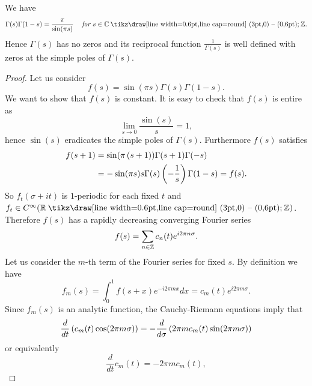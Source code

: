 \begin{theorem}
	We have
\begin{equation*}
	\Gamma(s)\Gamma(1 - s) = \frac{\pi}{\sin(\pi s)} \hsp \textit{  for } s \in \field{C} \mysetminus \field{Z}.
\end{equation*}
	Hence $\Gamma(s)$ has no zeros and its reciprocal function $\frac{1}{\Gamma(s)}$ is well defined with zeros at the simple poles of $\Gamma(s)$.
\end{theorem}
\begin{proof}
	Let us consider
\begin{equation*}
	f(s) = \sin(\pi s) \Gamma(s) \Gamma(1 - s).
\end{equation*}
	We want to show that $f(s)$ is constant. It is easy to check that $f(s)$ is entire as
\begin{equation*}
	\lim\limits_{s \to 0} \frac{\sin(s)}{s} = 1,
\end{equation*}
	hence $\sin(s)$ eradicates the simple poles of $\Gamma(s)$. Furthermore $f(s)$ satisfies
\begin{equation*}
\begin{aligned}
	f(s + 1) 
	&= \sin(\pi \left(s + 1\right)) \Gamma(s + 1) \Gamma(-s) \\ 
	&= -\sin(\pi s) s \Gamma(s) \left(-\frac{1}{s}\right) \Gamma(1 - s) = f(s).
\end{aligned}
\end{equation*}
	So $f_t(\sigma + it)$ is $1$-periodic for each fixed $t$ and $f_t \in C^\infty(\field{R} \mysetminus \field{Z})$. Therefore $f(s)$ has a rapidly decreasing converging Fourier series
\begin{equation*}
	f(s) = \sum _{n \in \mathbb{Z}} c_n(t) e^{i 2 \pi n \sigma}.
\end{equation*}
	Let us consider the $m$-th term of the Fourier series for fixed $s$. By definition we have
\begin{equation*}
	f_m(s) = \int _0 ^1 f(s + x) e^{- i 2 \pi m x} dx = c_m(t) e^{i 2 \pi m \sigma}.
\end{equation*}
	Since $f_m(s)$ is an analytic function, the Cauchy-Riemann equations imply that
\begin{equation*}
	\frac{d}{dt}\left(c_m(t) \cos(2 \pi m \sigma)\right) = - \frac{d}{d\sigma}\left(2 \pi m c_m(t) \sin(2 \pi m \sigma)\right)
\end{equation*}
	or equivalently
\begin{equation*}
	\frac{d}{dt} c_m(t) = -2 \pi m c_m(t),
\end{equation*}

\end{proof}
